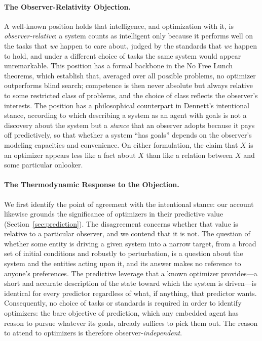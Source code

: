 \documentclass[10pt]{article}
\theoremstyle{definition}
\theoremstyle{remark}
\begin{document}
\paragraph{The Observer-Relativity Objection.} A well-known position holds that intelligence, and optimization with it, is \emph{observer-relative}: a system counts as intelligent only because it performs well on the tasks that \emph{we} happen to care about, judged by the standards that \emph{we} happen to hold, and under a different choice of tasks the same system would appear unremarkable. This position has a formal backbone in the No Free Lunch theorems, which establish that, averaged over all possible problems, no optimizer outperforms blind search; competence is then never absolute but always relative to some restricted class of problems, and the choice of class reflects the observer's interests. The position has a philosophical counterpart in Dennett's intentional stance, according to which describing a system as an agent with goals is not a discovery about the system but a \emph{stance} that an observer adopts because it pays off predictively, so that whether a system ``has goals'' depends on the observer's modeling capacities and convenience. On either formulation, the claim that $X$ is an optimizer appears less like a fact about $X$ than like a relation between $X$ and some particular onlooker.

\paragraph{The Thermodynamic Response to the Objection.} We first identify the point of agreement with the intentional stance: our account likewise grounds the significance of optimizers in their predictive value (Section~\ref{sec:prediction}). The disagreement concerns whether that value is relative to a particular observer, and we contend that it is not. The question of whether some entity is driving a given system into a narrow target, from a broad set of initial conditions and robustly to perturbation, is a question about the system and the entities acting upon it, and its answer makes no reference to anyone's preferences. The predictive leverage that a known optimizer provides---a short and accurate description of the state toward which the system is driven---is identical for every predictor regardless of what, if anything, that predictor wants. Consequently, no choice of tasks or standards is required in order to identify optimizers: the bare objective of prediction, which any embedded agent has reason to pursue whatever its goals, already suffices to pick them out. The reason to attend to optimizers is therefore observer-\emph{independent}.
\end{document}
